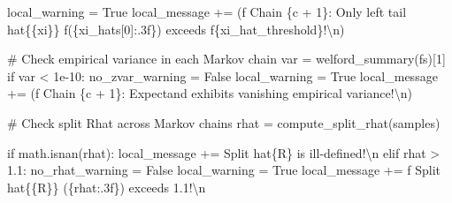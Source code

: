\documentclass[
  letterpaper,
  DIV=11,
  numbers=noendperiod]{scrartcl}
\newenvironment{Shaded}{\begin{snugshade}}{\end{snugshade}}
\newcommand{\CharTok}[1]{\textcolor[rgb]{0.13,0.47,0.30}{#1}}
\newcommand{\CommentTok}[1]{\textcolor[rgb]{0.37,0.37,0.37}{#1}}
\newcommand{\ControlFlowTok}[1]{\textcolor[rgb]{0.00,0.23,0.31}{#1}}
\newcommand{\DecValTok}[1]{\textcolor[rgb]{0.68,0.00,0.00}{#1}}
\newcommand{\FloatTok}[1]{\textcolor[rgb]{0.68,0.00,0.00}{#1}}
\newcommand{\NormalTok}[1]{\textcolor[rgb]{0.00,0.23,0.31}{#1}}
\newcommand{\OperatorTok}[1]{\textcolor[rgb]{0.37,0.37,0.37}{#1}}
\newcommand{\SpecialCharTok}[1]{\textcolor[rgb]{0.37,0.37,0.37}{#1}}
\newcommand{\SpecialStringTok}[1]{\textcolor[rgb]{0.13,0.47,0.30}{#1}}
\newcommand{\StringTok}[1]{\textcolor[rgb]{0.13,0.47,0.30}{#1}}
\newcommand{\VariableTok}[1]{\textcolor[rgb]{0.07,0.07,0.07}{#1}}
\begin{document}
\begin{Shaded}
\begin{Highlighting}[]
\NormalTok{        local\_warning }\OperatorTok{=} \VariableTok{True}
\NormalTok{        local\_message }\OperatorTok{+=}\NormalTok{ (}\SpecialStringTok{f\textquotesingle{}  Chain }\SpecialCharTok{\{}\NormalTok{c }\OperatorTok{+} \DecValTok{1}\SpecialCharTok{\}}\SpecialStringTok{: Only left tail hat}\CharTok{\{\{}\SpecialStringTok{xi}\CharTok{\}\}}\SpecialStringTok{ \textquotesingle{}}
                          \SpecialStringTok{f\textquotesingle{}(}\SpecialCharTok{\{}\NormalTok{xi\_hats[}\DecValTok{0}\NormalTok{]}\SpecialCharTok{:.3f\}}\SpecialStringTok{) exceeds \textquotesingle{}}
                          \SpecialStringTok{f\textquotesingle{}}\SpecialCharTok{\{}\NormalTok{xi\_hat\_threshold}\SpecialCharTok{\}}\SpecialStringTok{!}\CharTok{\textbackslash{}n}\SpecialStringTok{\textquotesingle{}}\NormalTok{)}
      
      \CommentTok{\# Check empirical variance in each Markov chain}
\NormalTok{      var }\OperatorTok{=}\NormalTok{ welford\_summary(fs)[}\DecValTok{1}\NormalTok{]}
      \ControlFlowTok{if}\NormalTok{ var }\OperatorTok{\textless{}} \FloatTok{1e{-}10}\NormalTok{:}
\NormalTok{        no\_zvar\_warning }\OperatorTok{=} \VariableTok{False}
\NormalTok{        local\_warning }\OperatorTok{=} \VariableTok{True}
\NormalTok{        local\_message }\OperatorTok{+=}\NormalTok{ (}\SpecialStringTok{f\textquotesingle{}  Chain }\SpecialCharTok{\{}\NormalTok{c }\OperatorTok{+} \DecValTok{1}\SpecialCharTok{\}}\SpecialStringTok{: Expectand exhibits \textquotesingle{}}
                          \StringTok{\textquotesingle{}vanishing empirical variance!}\CharTok{\textbackslash{}n}\StringTok{\textquotesingle{}}\NormalTok{)}
    
    \CommentTok{\# Check split Rhat across Markov chains}
\NormalTok{    rhat }\OperatorTok{=}\NormalTok{ compute\_split\_rhat(samples)}

    \ControlFlowTok{if}\NormalTok{ math.isnan(rhat):}
\NormalTok{      local\_message }\OperatorTok{+=} \StringTok{\textquotesingle{}  Split hat}\SpecialCharTok{\{R\}}\StringTok{ is ill{-}defined!}\CharTok{\textbackslash{}n}\StringTok{\textquotesingle{}}
    \ControlFlowTok{elif}\NormalTok{ rhat }\OperatorTok{\textgreater{}} \FloatTok{1.1}\NormalTok{:}
\NormalTok{      no\_rhat\_warning }\OperatorTok{=} \VariableTok{False}
\NormalTok{      local\_warning }\OperatorTok{=} \VariableTok{True}
\NormalTok{      local\_message }\OperatorTok{+=} \SpecialStringTok{f\textquotesingle{}  Split hat}\CharTok{\{\{}\SpecialStringTok{R}\CharTok{\}\}}\SpecialStringTok{ (}\SpecialCharTok{\{}\NormalTok{rhat}\SpecialCharTok{:.3f\}}\SpecialStringTok{) exceeds 1.1!}\CharTok{\textbackslash{}n}\SpecialStringTok{\textquotesingle{}}


\end{Highlighting}
\end{Shaded}
\end{document}
